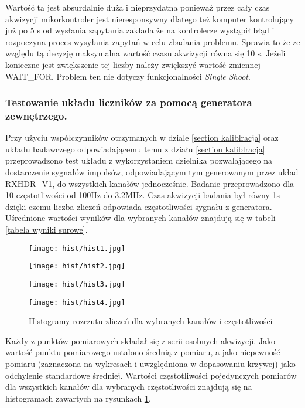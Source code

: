 Wartość ta jest absurdalnie duża i nieprzydatna ponieważ przez cały czas akwizycji mikorkontroler jest nieresponsywny dlatego też komputer kontrolujący już po 5 s od wysłania zapytania zakłada że na kontrolerze wystąpił błąd i rozpoczyna proces wysyłania zapytań w celu zbadania problemu. Sprawia to że ze względu tą decyzję maksymalna wartość czasu akwizycji równa się 10 s. Jeżeli konieczne jest zwiększenie tej liczby należy zwiększyć wartość zmiennej WAIT\_FOR. Problem ten nie dotyczy funkcjonalności \textit{Single Shoot}.   

\subsubsection{Testowanie układu liczników za pomocą generatora zewnętrzego.}

Przy użyciu współczynników otrzymanych w dziale \ref{section kaliblracja} oraz układu badawczego odpowiadającemu temu z działu \ref{section kaliblracja} przeprowadzono test układu z wykorzystaniem dzielnika pozwalającego na dostarczenie sygnałów impulsów, odpowiadającym tym generowanym przez układ RXHDR\_V1, do wszystkich kanałów jednocześnie.
Badanie przeprowadzono dla 10 częstotliwości od 100Hz do 3.2MHz. Czas akwizycji badania był równy 1s dzięki czemu liczba zliczeń odpowiada częstotliwości sygnału z generatora. Uśrednione wartości wyników dla wybranych kanałów znajdują się w tabeli \ref{tabela wyniki surowe}.

\begin{figure}
        \begin{multicols}{2}
            \texttt{[image: hist/hist1.jpg]} \par    
            \texttt{[image: hist/hist2.jpg]} \par    
        \end{multicols} \hfill
        \begin{multicols}{2}
            \texttt{[image: hist/hist3.jpg]} \par
            \texttt{[image: hist/hist4.jpg]} \par    
        \end{multicols}
        \caption{Histogramy rozrzutu zliczeń dla wybranych kanałów i częstotliwości}
        \label{hist licz}
\end{figure}



Każdy z punktów pomiarowych składał się z serii osobnych akwizycji. Jako wartość punktu pomiarowego ustalono średnią z pomiaru, a jako niepewność pomiaru (zaznaczona na wykresach i uwzględniona w dopasowaniu krzywej) jako odchylenie standardowe średniej. Wartości częstotliwości pojedynczych pomiarów dla wszystkich kanałów dla wybranych częstotliwości znajdują się na histogramach zawartych na rysunkach \ref{hist licz}. 

